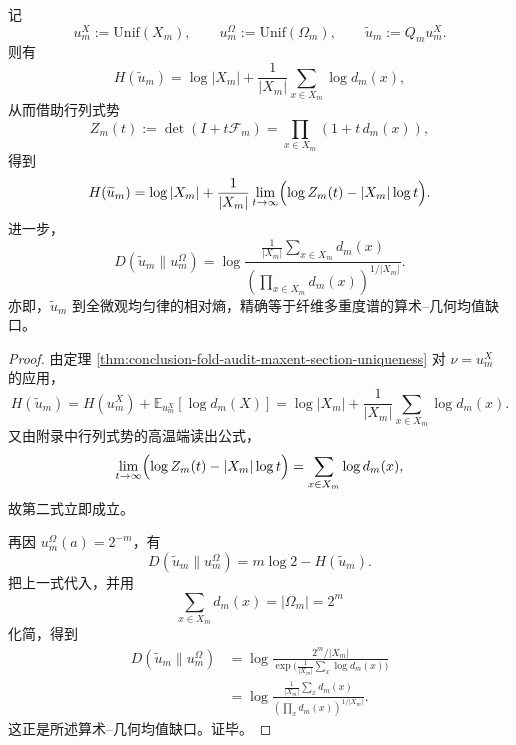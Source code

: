 \begin{theorem}\label{thm:conclusion-fold-audit-uniform-law-agm-gap}
记
\[
u_m^X:=\mathrm{Unif}(X_m),\qquad
u_m^\Omega:=\mathrm{Unif}(\Omega_m),\qquad
\widetilde u_m:=Q_m u_m^X.
\]
则有
\[
H(\widetilde u_m)
=
\log|X_m|
+
\frac{1}{|X_m|}\sum_{x\in X_m}\log d_m(x),
\]
从而借助行列式势
\[
Z_m(t):=\det(I+t\mathcal F_m)=\prod_{x\in X_m}(1+t\,d_m(x)),
\]
得到
\[
H(\widetilde u_m)
=
\log|X_m|
+
\frac{1}{|X_m|}
\lim_{t\to\infty}\Bigl(\log Z_m(t)-|X_m|\log t\Bigr).
\]
进一步，
\[
D(\widetilde u_m\|u_m^\Omega)
=
\log\frac{\frac1{|X_m|}\sum_{x\in X_m}d_m(x)}
{\left(\prod_{x\in X_m}d_m(x)\right)^{1/|X_m|}}.
\]
亦即，\(\widetilde u_m\) 到全微观均匀律的相对熵，精确等于纤维多重度谱的算术--几何均值缺口。
\end{theorem}
\begin{proof}
由定理 \ref{thm:conclusion-fold-audit-maxent-section-uniqueness} 对 \(\nu=u_m^X\) 的应用，
\[
H(\widetilde u_m)
=
H(u_m^X)+\mathbb E_{u_m^X}[\log d_m(X)]
=
\log|X_m|+\frac1{|X_m|}\sum_{x\in X_m}\log d_m(x).
\]
又由附录中行列式势的高温端读出公式，
\[
\lim_{t\to\infty}\Bigl(\log Z_m(t)-|X_m|\log t\Bigr)
=
\sum_{x\in X_m}\log d_m(x),
\]
故第二式立即成立。

再因 \(u_m^\Omega(a)=2^{-m}\)，有
\[
D(\widetilde u_m\|u_m^\Omega)=m\log 2-H(\widetilde u_m).
\]
把上一式代入，并用
\[
\sum_{x\in X_m}d_m(x)=|\Omega_m|=2^m
\]
化简，得到
\[
\begin{aligned}
D(\widetilde u_m\|u_m^\Omega)
&=
\log\frac{2^m/|X_m|}
{\exp\bigl(\frac1{|X_m|}\sum_x\log d_m(x)\bigr)}\\
&=
\log\frac{\frac1{|X_m|}\sum_x d_m(x)}
{\left(\prod_x d_m(x)\right)^{1/|X_m|}}.
\end{aligned}
\]
这正是所述算术--几何均值缺口。证毕。
\end{proof}


